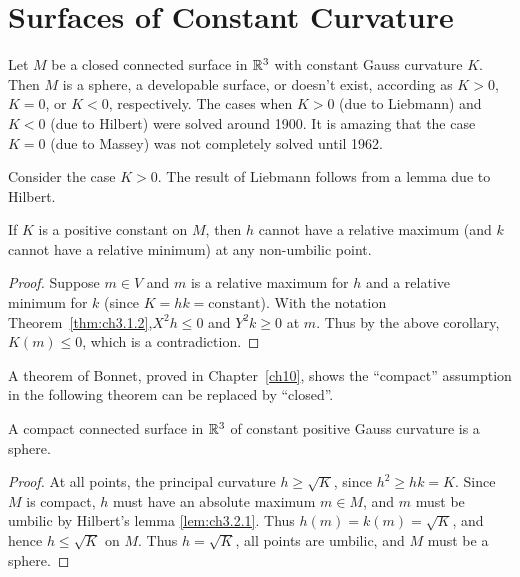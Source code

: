 \documentclass[../main]{subfiles}
\begin{document}
\section{Surfaces of Constant Curvature}\label{ch03:s2}
Let $M$ be a closed connected surface in $\mathbb{R}^3$ with constant Gauss curvature $K$. Then $M$ is a sphere, a developable surface, or doesn't exist, according as $K > 0$, $K = 0$, or $K < 0$, respectively. The cases when $K > 0$ (due to Liebmann) and $K < 0$ (due to Hilbert) were solved around 1900. It is amazing that the case $K = 0$ (due to Massey) was not completely solved until 1962.

Consider the case $K > 0$. The result of Liebmann follows from a lemma due to Hilbert.



\begin{lemma} \label{lem:ch3.2.1}
If $K$ is a positive constant on $M$, then $h$ cannot have a relative maximum (and $k$ cannot have a relative minimum) at any non-umbilic point.
\end{lemma}

\begin{proof}
Suppose $m \in V$ and $m$ is a relative maximum for $h$ and a relative minimum for $k$ (since $K = hk = \text{constant}$). With the notation Theorem~\ref{thm:ch3.1.2},\newline  $X^2 h \le 0$ and $Y^2 k \ge 0$ at $m$. Thus by the above corollary, $K(m) \le 0$, which is a contradiction.
\end{proof}



A theorem of Bonnet, proved in Chapter~\ref{ch10}, shows the ``compact'' assumption in the following theorem can be replaced by ``closed''.



\begin{theorem} \label{thm:ch3.2.2}
A compact connected surface in $\mathbb{R}^3$ of constant positive Gauss curvature is a sphere.
\end{theorem}

\begin{proof}
At all points, the principal curvature $h \ge \sqrt K$, since $h^2 \ge hk = K$. Since $M$ is compact, $h$ must have an absolute maximum $m \in M$, and $m$ must be umbilic by Hilbert's lemma \ref{lem:ch3.2.1}. Thus $h(m) = k(m) = \sqrt K$, and hence $h \le \sqrt K$ on $M$. Thus $h = \sqrt K$, all points are umbilic, and $M$ must be a sphere.
\end{proof}
\end{document}
